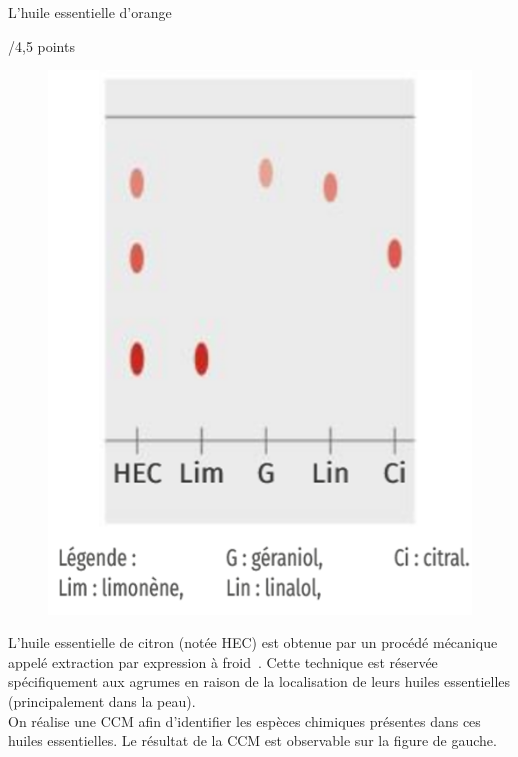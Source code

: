 \begin{doc}{L'huile essentielle d'orange\begin{Large}
    /4,5 points
\end{Large}}
\begin{figure}
\vspace{-1cm}
    \centering
      \includegraphics[scale=0.65]{Images/CCm_HEO_3.png}
  \end{figure}
L'huile essentielle de citron (notée HEC) est obtenue par un procédé mécanique appelé \og extraction par expression à froid\fg~. Cette technique est réservée spécifiquement aux agrumes en raison de la localisation de leurs huiles essentielles (principalement dans la peau).\\
On réalise une CCM afin d'identifier les espèces chimiques présentes dans ces huiles essentielles. Le résultat de la CCM est observable sur la figure de gauche.\\


\end{doc}
